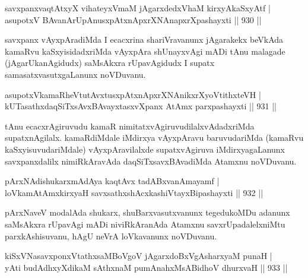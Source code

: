 
\begin{shl}
savxpanxvaqtAtxyX vihateyxVmaM jAgarxdedxVhaM kirxyAkaSxyAtf | \\
asupotxV BAvanArUpAnusxpAtxnApxrXNAnapxrXpashayxti \hfill||  930 ||  
\end{shl}

\begin{artha}
savxpanx vAyxpAradiMda I ecacxrina shariVravanunx jAgarakekx beVkAda kamaRvu kaSxyisidadxriMda vAyxpAra shUnayxvAgi mADi tAnu malagade (jAgarUkanAgidudx) saMsAkxra rUpavAgidudx I supatx samasatxvasutxgaLanunx noVDuvanu.
\end{artha}


\begin{shl}
asupotxV\s kamaRheVtutAvxtusxpAtxnApxrXNAnikxrXyoVtithxteVH | \\
kUTasathxdaqSiTxsAvxBAvayxtasxvXpanx AtAmx parxpashayxti \hfill||  931 ||  
\end{shl}

\begin{artha}
tAnu ecacxrAgiruvudu kamaR nimitatxvAgiruvudilalxvAdadxriMda supatxnAgilalx. kamaRdiMdale iMdirxya vAyxpAravu baruvudariMda (kamaRvu kaSxyisuvudariMdale) vAyxpAravilalxde supatxvAgiruva iMdirxyagaLanunx savxpanxdalilx nimiRkAravAda daqSiTxsavxBAvadiMda Atamxnu noVDuvanu.
\end{artha}


\begin{shl}
pArxNAdishukarxmAdAya kaqtAvx tadABxvanAmayamf | \\
loVkamAtAmx\s kirxyaH savxsathxshAcxkashiVtayxBipashayxti \hfill||  932 ||  
\end{shl}

\begin{artha}
pArxNaveV modalAda shukarx, shuBarxvasutxvanunx tegedukoMDu adanunx saMsAkxra rUpavAgi mADi niviRkAranAda Atamxnu savxrUpadalelxniMtu parxkAshisuvanu, hAgU neVrA loVkavanunx noVDuvanu.
\end{artha}


\begin{shl}
kiSxVNasavxponxVtathxsaMBoVgoV jAgarxdoBxVgAsharxyaM punaH | \\
yAti budAdhxyXdikaM sAthxnaM pumAnahxMsABidhoV dhurxvaH \hfill||  933 ||  
\end{shl}

